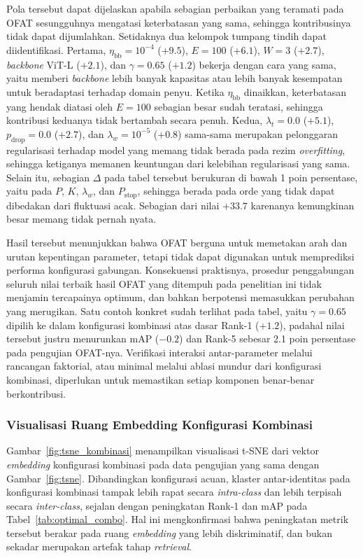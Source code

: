 Pola tersebut dapat dijelaskan apabila sebagian perbaikan yang teramati pada OFAT sesungguhnya mengatasi keterbatasan yang sama, sehingga kontribusinya tidak dapat dijumlahkan. Setidaknya dua kelompok tumpang tindih dapat diidentifikasi. Pertama, $\eta_{\text{bb}}=10^{-4}$ ($+9{.}5$), $E=100$ ($+6{.}1$), $W=3$ ($+2{.}7$), \textit{backbone} ViT-L ($+2{.}1$), dan $\gamma=0{.}65$ ($+1{.}2$) bekerja dengan cara yang sama, yaitu memberi \textit{backbone} lebih banyak kapasitas atau lebih banyak kesempatan untuk beradaptasi terhadap domain penyu. Ketika $\eta_{\text{bb}}$ dinaikkan, keterbatasan yang hendak diatasi oleh $E=100$ sebagian besar sudah teratasi, sehingga kontribusi keduanya tidak bertambah secara penuh. Kedua, $\lambda_t=0{.}0$ ($+5{.}1$), $p_{\text{drop}}=0{.}0$ ($+2{.}7$), dan $\lambda_w=10^{-5}$ ($+0{.}8$) sama-sama merupakan pelonggaran regularisasi terhadap model yang memang tidak berada pada rezim \textit{overfitting}, sehingga ketiganya memanen keuntungan dari kelebihan regularisasi yang sama. Selain itu, sebagian $\Delta$ pada tabel tersebut berukuran di bawah 1 poin persentase, yaitu pada $P$, $K$, $\lambda_w$, dan $P_{\text{stop}}$, sehingga berada pada orde yang tidak dapat dibedakan dari fluktuasi acak. Sebagian dari nilai $+33{.}7$ karenanya kemungkinan besar memang tidak pernah nyata.

Hasil tersebut menunjukkan bahwa OFAT berguna untuk memetakan arah dan urutan kepentingan parameter, tetapi tidak dapat digunakan untuk memprediksi performa konfigurasi gabungan. Konsekuensi praktisnya, prosedur penggabungan seluruh nilai terbaik hasil OFAT yang ditempuh pada penelitian ini tidak menjamin tercapainya optimum, dan bahkan berpotensi memasukkan perubahan yang merugikan. Satu contoh konkret sudah terlihat pada tabel, yaitu $\gamma=0{.}65$ dipilih ke dalam konfigurasi kombinasi atas dasar Rank-1 ($+1{.}2$), padahal nilai tersebut justru menurunkan mAP ($-0{.}2$) dan Rank-5 sebesar 2.1 poin persentase pada pengujian OFAT-nya. Verifikasi interaksi antar-parameter melalui rancangan faktorial, atau minimal melalui ablasi mundur dari konfigurasi kombinasi, diperlukan untuk memastikan setiap komponen benar-benar berkontribusi.

\subsubsection{Visualisasi Ruang Embedding Konfigurasi Kombinasi}

Gambar~\ref{fig:tsne_kombinasi} menampilkan visualisasi t-SNE dari vektor \textit{embedding} konfigurasi kombinasi pada data pengujian yang sama dengan Gambar~\ref{fig:tsne}. Dibandingkan konfigurasi acuan, klaster antar-identitas pada konfigurasi kombinasi tampak lebih rapat secara \textit{intra-class} dan lebih terpisah secara \textit{inter-class}, sejalan dengan peningkatan Rank-1 dan mAP pada Tabel~\ref{tab:optimal_combo}. Hal ini mengkonfirmasi bahwa peningkatan metrik tersebut berakar pada ruang \textit{embedding} yang lebih diskriminatif, dan bukan sekadar merupakan artefak tahap \textit{retrieval}.

